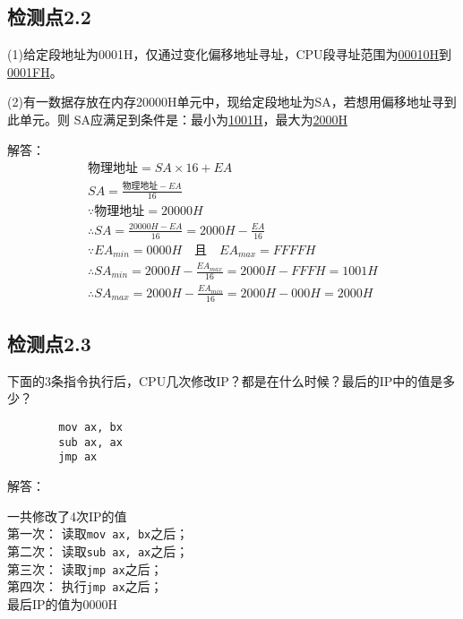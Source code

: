 \documentclass{elegantnote}
\begin{document}
    \subsection*{检测点2.2}
    (1)给定段地址为0001H，仅通过变化偏移地址寻址，CPU段寻址范围为\underline{00010H}到\underline{0001FH}。\par
    (2)有一数据存放在内存20000H单元中，现给定段地址为SA，若想用偏移地址寻到此单元。则
    SA应满足到条件是：最小为\underline{1001H}，最大为\underline{2000H}\par
    解答：
    \begin{gather*}
        \text{物理地址} = SA \times 16 + EA \\
        SA= \frac{\text{物理地址}-EA}{16} \\
        \because\text{物理地址}= 20000H \\
        \therefore SA = \frac{20000H-EA}{16} = 2000H - \frac{EA}{16}\\
        \because EA_{min} = 0000H \text{{ } 且 { }} EA_{max} = FFFFH\\
        \therefore SA_{min} = 2000H - \frac{EA_{max}}{16} = 2000H - FFFH = 1001H\\
        \therefore SA_{max} = 2000H - \frac{EA_{min}}{16} = 2000H - 000H = 2000H
    \end{gather*}\par
    \subsection*{检测点2.3}
    下面的3条指令执行后，CPU几次修改IP？都是在什么时候？最后的IP中的值是多少？\par
    \begin{verbatim}
        mov ax, bx
        sub ax, ax
        jmp ax
    \end{verbatim}\par
    解答：
    \begin{center}
        一共修改了4次IP的值 \\
        第一次： 读取\verb|mov ax, bx|之后；\\
        第二次： 读取\verb|sub ax, ax|之后；\\
        第三次： 读取\verb|jmp ax|之后；\\
        第四次： 执行\verb|jmp ax|之后；\\
        最后IP的值为0000H
    \end{center}
    
\end{document}

